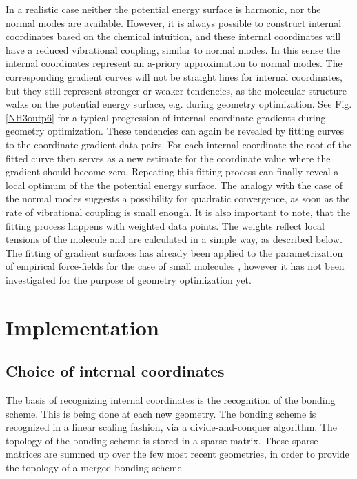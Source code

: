 \documentclass[prl,aps,twocolumn,showpacs,twocolumngrid,superbib]{revtex4}
\begin{document}
In a realistic case neither the potential energy surface is 
harmonic, nor the normal modes are available. However, it is always
possible to construct internal coordinates based on the chemical
intuition, and these internal coordinates will have a reduced
vibrational coupling, similar to normal modes. 
In this sense the internal coordinates represent an a-priory
approximation to normal modes.
The corresponding
gradient curves will not be straight lines for internal coordinates,
but they still represent stronger or weaker tendencies, as the molecular
structure walks on the potential energy surface, e.g. during geometry
optimization. 
See Fig. \ref{NH3outp6} for a typical progression of internal
coordinate gradients during geometry optimization.
These tendencies can again be revealed by fitting curves to the
coordinate-gradient data pairs. For each internal coordinate 
the root of the fitted curve then 
serves as a new estimate for the coordinate value where the gradient
should become zero. Repeating this fitting process can finally
reveal a local optimum of the the potential energy surface.
The analogy with the case of the normal modes suggests a possibility
for quadratic convergence, as soon as the rate of vibrational
coupling is small enough.
It is also important to note, that the fitting process happens
with weighted data points. The weights reflect local tensions
of the molecule and are calculated in a simple way, as described below.
The fitting of gradient surfaces has already been applied to 
the parametrization of empirical
force-fields for the case of small molecules
\cite{force-field-fitting,force-matching}, however it 
has not been investigated for the purpose of geometry optimization yet.

\section{Implementation}
\subsection{Choice of internal coordinates}
The basis of recognizing internal coordinates is the recognition
of the bonding scheme. This is being done at each new geometry.
The bonding scheme is recognized in a linear scaling fashion, via
a divide-and-conquer algorithm. The topology of the bonding scheme
is stored in a sparse matrix. These sparse matrices are summed
up over the few most recent geometries, in order to provide
the topology of a merged bonding scheme.
\end{document}
